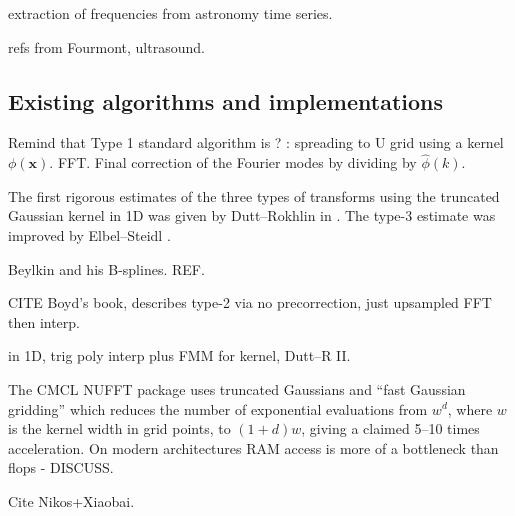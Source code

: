 \documentclass[10pt]{article}
\newcommand{\mbf}[1]{{\mathbf #1}}
\newcommand{\xx}{\mbf{x}}
\begin{document}
extraction of frequencies from astronomy time series.

refs from Fourmont, ultrasound.



\subsection{Existing algorithms and implementations}

Remind that Type 1 standard algorithm is ? :
spreading to U grid using a kernel $\phi(\xx)$.
FFT.
Final correction of the Fourier modes by dividing by
$\hat\phi(k)$.

The first rigorous estimates of the three types of transforms
using the truncated Gaussian kernel in 1D was given by
Dutt--Rokhlin in \cite{dutt}.
The type-3 estimate was improved by Elbel--Steidl \cite{elbel}.


Beylkin and his B-splines. REF.

CITE Boyd's book, describes type-2 via no precorrection, just upsampled FFT
then interp.

in 1D, trig poly interp plus FMM for kernel, Dutt--R II.

The CMCL NUFFT package \cite{cmcl} uses truncated Gaussians
and ``fast Gaussian gridding'' \cite[Sec.~3]{nufft}
which reduces the number of exponential evaluations
from $w^d$, where $w$ is the kernel width in grid points,
to $(1+d)w$, giving a claimed 5--10 times acceleration.
On modern architectures RAM access is more of a bottleneck than
flops - DISCUSS.

Cite Nikos+Xiaobai.




\end{document}
